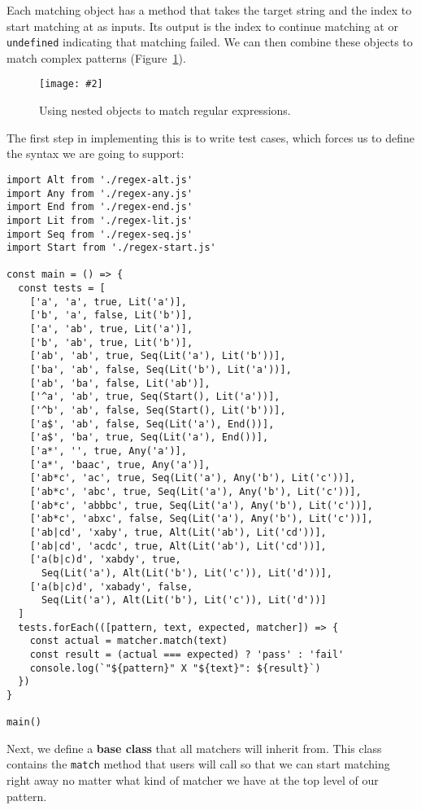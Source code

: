 \documentclass[krantzl]{krantz}
\newcommand{\figpdf}[4]{\begin{figure}%
\centering%
\texttt{[image: \#2]}%
\caption{#3}%
\label{#1}%
\end{figure}}
\newcommand{\figref}[1]{Figure~\ref{#1}}
\newcommand{\glossref}[1]{\textbf{#1}}
\begin{document}
Each matching object has a method that takes the target string and the index to start matching at as inputs.
Its output is the index to continue matching at
or \texttt{undefined} indicating that matching failed.
We can then combine these objects to match complex patterns
(\figref{pattern-matching-regex-objects}).

\figpdf{pattern-matching-regex-objects}{./pattern-matching/regex-objects.pdf}{Using nested objects to match regular expressions.}{0.6}


The first step in implementing this is to write test cases,
which forces us to define the syntax we are going to support:


\begin{lstlisting}[frame=single,frameround=tttt]
import Alt from './regex-alt.js'
import Any from './regex-any.js'
import End from './regex-end.js'
import Lit from './regex-lit.js'
import Seq from './regex-seq.js'
import Start from './regex-start.js'

const main = () => {
  const tests = [
    ['a', 'a', true, Lit('a')],
    ['b', 'a', false, Lit('b')],
    ['a', 'ab', true, Lit('a')],
    ['b', 'ab', true, Lit('b')],
    ['ab', 'ab', true, Seq(Lit('a'), Lit('b'))],
    ['ba', 'ab', false, Seq(Lit('b'), Lit('a'))],
    ['ab', 'ba', false, Lit('ab')],
    ['^a', 'ab', true, Seq(Start(), Lit('a'))],
    ['^b', 'ab', false, Seq(Start(), Lit('b'))],
    ['a$', 'ab', false, Seq(Lit('a'), End())],
    ['a$', 'ba', true, Seq(Lit('a'), End())],
    ['a*', '', true, Any('a')],
    ['a*', 'baac', true, Any('a')],
    ['ab*c', 'ac', true, Seq(Lit('a'), Any('b'), Lit('c'))],
    ['ab*c', 'abc', true, Seq(Lit('a'), Any('b'), Lit('c'))],
    ['ab*c', 'abbbc', true, Seq(Lit('a'), Any('b'), Lit('c'))],
    ['ab*c', 'abxc', false, Seq(Lit('a'), Any('b'), Lit('c'))],
    ['ab|cd', 'xaby', true, Alt(Lit('ab'), Lit('cd'))],
    ['ab|cd', 'acdc', true, Alt(Lit('ab'), Lit('cd'))],
    ['a(b|c)d', 'xabdy', true,
      Seq(Lit('a'), Alt(Lit('b'), Lit('c')), Lit('d'))],
    ['a(b|c)d', 'xabady', false,
      Seq(Lit('a'), Alt(Lit('b'), Lit('c')), Lit('d'))]
  ]
  tests.forEach(([pattern, text, expected, matcher]) => {
    const actual = matcher.match(text)
    const result = (actual === expected) ? 'pass' : 'fail'
    console.log(`"${pattern}" X "${text}": ${result}`)
  })
}

main()
\end{lstlisting}



Next,
we define a \glossref{base class} that all matchers will inherit from.
This class contains the \texttt{match} method that users will call
so that we can start matching right away
no matter what kind of matcher we have at the top level of our pattern.
\end{document}
